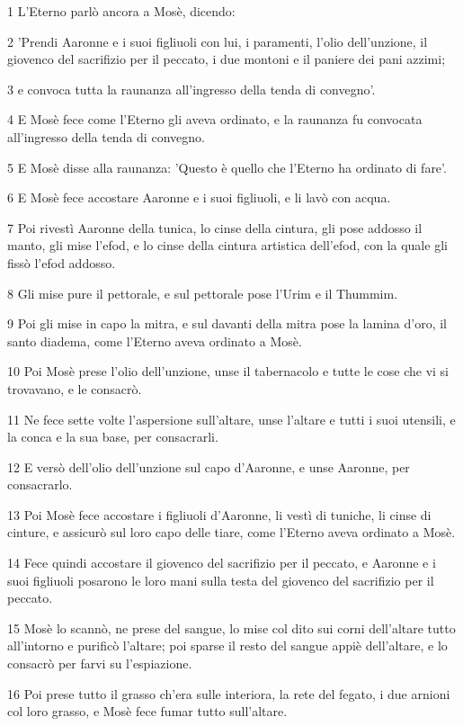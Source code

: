 \par 1 L'Eterno parlò ancora a Mosè, dicendo:
\par 2 'Prendi Aaronne e i suoi figliuoli con lui, i paramenti, l'olio dell'unzione, il giovenco del sacrifizio per il peccato, i due montoni e il paniere dei pani azzimi;
\par 3 e convoca tutta la raunanza all'ingresso della tenda di convegno'.
\par 4 E Mosè fece come l'Eterno gli aveva ordinato, e la raunanza fu convocata all'ingresso della tenda di convegno.
\par 5 E Mosè disse alla raunanza: 'Questo è quello che l'Eterno ha ordinato di fare'.
\par 6 E Mosè fece accostare Aaronne e i suoi figliuoli, e li lavò con acqua.
\par 7 Poi rivestì Aaronne della tunica, lo cinse della cintura, gli pose addosso il manto, gli mise l'efod, e lo cinse della cintura artistica dell'efod, con la quale gli fissò l'efod addosso.
\par 8 Gli mise pure il pettorale, e sul pettorale pose l'Urim e il Thummim.
\par 9 Poi gli mise in capo la mitra, e sul davanti della mitra pose la lamina d'oro, il santo diadema, come l'Eterno aveva ordinato a Mosè.
\par 10 Poi Mosè prese l'olio dell'unzione, unse il tabernacolo e tutte le cose che vi si trovavano, e le consacrò.
\par 11 Ne fece sette volte l'aspersione sull'altare, unse l'altare e tutti i suoi utensili, e la conca e la sua base, per consacrarli.
\par 12 E versò dell'olio dell'unzione sul capo d'Aaronne, e unse Aaronne, per consacrarlo.
\par 13 Poi Mosè fece accostare i figliuoli d'Aaronne, li vestì di tuniche, li cinse di cinture, e assicurò sul loro capo delle tiare, come l'Eterno aveva ordinato a Mosè.
\par 14 Fece quindi accostare il giovenco del sacrifizio per il peccato, e Aaronne e i suoi figliuoli posarono le loro mani sulla testa del giovenco del sacrifizio per il peccato.
\par 15 Mosè lo scannò, ne prese del sangue, lo mise col dito sui corni dell'altare tutto all'intorno e purificò l'altare; poi sparse il resto del sangue appiè dell'altare, e lo consacrò per farvi su l'espiazione.
\par 16 Poi prese tutto il grasso ch'era sulle interiora, la rete del fegato, i due arnioni col loro grasso, e Mosè fece fumar tutto sull'altare.
